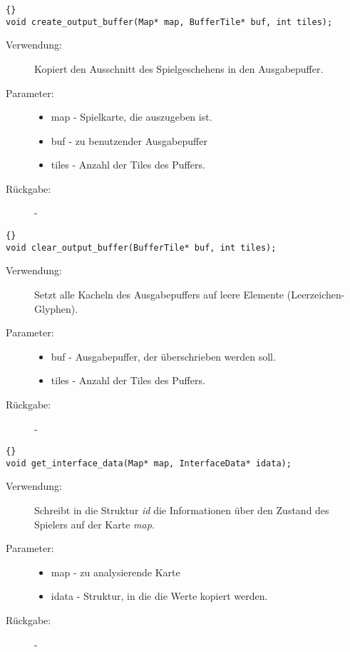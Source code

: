 \documentclass[11pt,a4paper,notitlepage]{report}
\begin{document}
		\begin{lstlisting}[caption=create\_output\_buffer]{}
void create_output_buffer(Map* map, BufferTile* buf, int tiles);
		\end{lstlisting}
		
	\begin{description}
		\item[Verwendung:] Kopiert den Ausschnitt des Spielgeschehens in den Ausgabepuffer.
		\item[Parameter:] \hfill
		\begin{itemize}
			\item map - Spielkarte, die auszugeben ist.
			\item buf - zu benutzender Ausgabepuffer
			\item tiles - Anzahl der Tiles des Puffers.
		\end{itemize}
		\item[Rückgabe:] -
	\end{description}
	
		\begin{lstlisting}[caption=flush\_output\_buffer]{}
void clear_output_buffer(BufferTile* buf, int tiles);
		\end{lstlisting}
		
	\begin{description}
		\item[Verwendung:] Setzt alle Kacheln des Ausgabepuffers auf leere Elemente (Leerzeichen-Glyphen).
		\item[Parameter:] \hfill
		\begin{itemize}
			\item buf - Ausgabepuffer, der überschrieben werden soll.
			\item tiles - Anzahl der Tiles des Puffers.
		\end{itemize}
		\item[Rückgabe:] -
	\end{description}
	
		\begin{lstlisting}[caption=get\_interface\_data]{}
void get_interface_data(Map* map, InterfaceData* idata);
		\end{lstlisting}
		
	\begin{description}
		\item[Verwendung:] Schreibt in die Struktur \textit{id} die Informationen über den Zustand des Spielers auf der Karte \textit{map}.
		\item[Parameter:] \hfill
		\begin{itemize}
			\item map - zu analysierende Karte
			\item idata - Struktur, in die die Werte kopiert werden.
		\end{itemize}
		\item[Rückgabe:] -
	\end{description}
	
\end{document}
